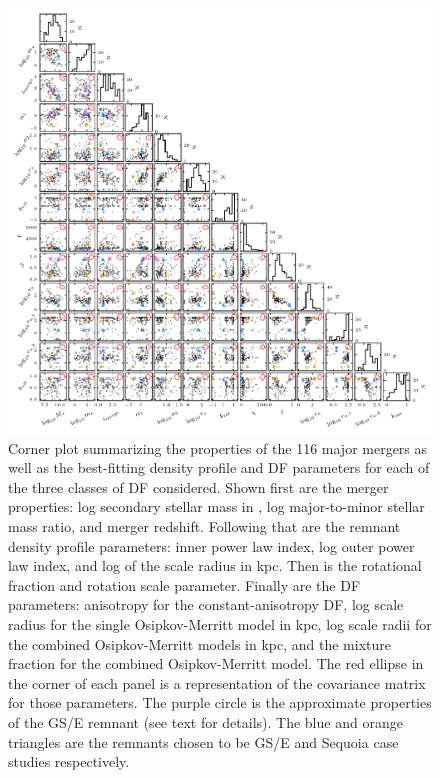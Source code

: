 \begin{figure}
    \centering
    \includegraphics[width=\textwidth]{figure/ch4/density_df_params.pdf}
    \caption{Corner plot summarizing the properties of the 116 major mergers as well as the best-fitting density profile and DF parameters for each of the three classes of DF considered. Shown first are the merger properties: log secondary stellar mass in \Msun, log major-to-minor stellar mass ratio, and merger redshift. Following that are the remnant density profile parameters: inner power law index, log outer power law index, and log of the scale radius in kpc. Then is the rotational fraction and rotation scale parameter. Finally are the DF parameters: anisotropy for the constant-anisotropy DF, log scale radius for the single Osipkov-Merritt model in kpc, log scale radii for the combined Osipkov-Merritt models in kpc, and the mixture fraction for the combined Osipkov-Merritt model. The red ellipse in the corner of each panel is a representation of the covariance matrix for those parameters. The purple circle is the approximate properties of the GS/E remnant (see text for details). The blue and orange triangles are the remnants chosen to be GS/E and Sequoia case studies respectively.}
    \label{ch4:fig:density-df-params}
\end{figure}

